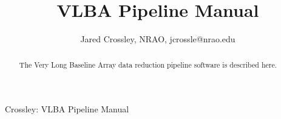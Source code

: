 \documentclass[10pt,onecolumn,final]{IEEEtran}
\begin{document}
%
\title{VLBA Pipeline Manual}
%
%
%

\author{Jared Crossley, NRAO, jcrossle@nrao.edu}

%
{Crossley: VLBA Pipeline Manual}
% 











\maketitle


\begin{abstract}
The Very Long Baseline Array data reduction pipeline software is described here.
\end{abstract}
\end{document}
